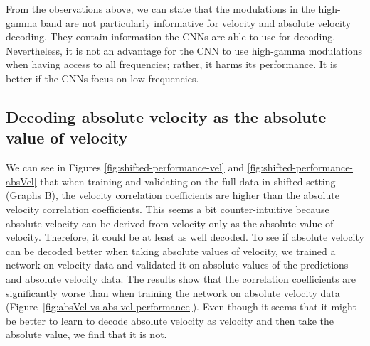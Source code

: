 From the observations above, we can state that the modulations in the high-gamma band are not particularly informative for velocity and absolute velocity decoding.
They contain information the CNNs are able to use for decoding. 
Nevertheless, it is not an advantage for the CNN to use high-gamma modulations when having access to all frequencies; rather, it harms its performance.
It is better if the CNNs focus on low frequencies.

\subsection{Decoding absolute velocity as the absolute value of velocity}
We can see in Figures \ref{fig:shifted-performance-vel} and \ref{fig:shifted-performance-absVel} that when training and validating on the full data in shifted setting (Graphs B), the velocity correlation coefficients are higher than the absolute velocity correlation coefficients. 
This seems a bit counter-intuitive because absolute velocity can be derived from velocity only as the absolute value of velocity. 
Therefore, it could be at least as well decoded.
To see if absolute velocity can be decoded better when taking absolute values of velocity, we trained a network on velocity data and validated it on absolute values of the predictions and absolute velocity data.
The results show that the correlation coefficients are significantly worse than when training the network on absolute velocity data (Figure~\ref{fig:absVel-vs-abs-vel-performance}). Even though it seems that it might be better to learn to decode absolute velocity as velocity and then take the absolute value, we find that it is not. 

